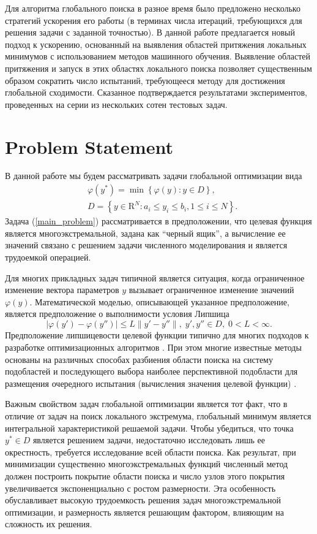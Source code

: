 \documentclass[entropy,article,submit,moreauthors,pdftex]{Definitions/mdpi}
\begin{document}
Для алгоритма глобального поиска в разное время было предложено несколько стратегий ускорения его работы (в терминах числа итераций, требующихся для решения задачи с заданной точностью). В данной работе предлагается новый подход к ускорению, основанный на выявления областей притяжения локальных минимумов с использованием методов машинного обучения. Выявление областей притяжения и запуск в этих областях локального поиска позволяет существенным образом сократить число испытаний, требующееся методу для достижения глобальной сходимости. Сказанное подтверждается результатами экспериментов, проведенных на серии из нескольких сотен тестовых задач. 



\section{Problem Statement}

В данной работе мы будем рассматривать задачи глобальной оптимизации вида
\begin{eqnarray}\label{main_problem}
& \varphi(y^\ast)=\min{\left\{\varphi(y):y\in D\right\}},\\
& D=\left\{y\in \text{R}^N: a_i\leq y_i \leq b_i, 1\leq i \leq N\right\}. \nonumber
\end{eqnarray}
Задача (\ref{main_problem}) рассматривается в предположении, что целевая функция является многоэкстремальной, задана как ``черный ящик'', а вычисление ее значений связано с решением задачи численного моделирования и является трудоемкой операцией.

Для многих прикладных задач типичной является ситуация, когда ограниченное изменение вектора параметров $y$ вызывает ограниченное изменение значений $\varphi(y)$. Математической моделью, описывающей указанное предположение, является предположение о выполнимости условия Липшица
\[
\left|\varphi(y')-\varphi(y'')\right|\leq L\left\|y'-y''\right\|,\; y',y'' \in D,\; 0<L<\infty.
\]
Предположение липшицевости целевой функции типично для многих подходов к разработке оптимизационных алгоритмов \cite{Jones1993,Pinter1996,Zilinskas2008,Evtushenko2009}.
При этом многие известные методы основаны на различных способах разбиения области поиска на систему подобластей и последующего выбора наиболее перспективной подобласти для размещения очередного испытания (вычисления значения целевой функции) \cite{Jones2009,Zilinskas2010,Evtushenko2013,Kvasov2013,Paulavicius2016}. 

Важным свойством задач глобальной оптимизации является тот факт, что в отличие от задач на поиск локального экстремума, глобальный минимум является интегральной характеристикой решаемой задачи. Чтобы убедиться, что точка $y^*\in D$ является решением задачи, недостаточно исследовать лишь ее окрестность, требуется исследование всей области поиска. Как результат, при минимизации существенно многоэкстремальных функций численный метод должен построить покрытие области поиска и число узлов этого покрытия увеличивается экспоненциально с ростом размерности. 
Эта особенность обуславливает высокую трудоемкость решения задач многоэкстремальной оптимизации, и размерность является решающим фактором, влияющим на сложность их решения. 
\end{document}
